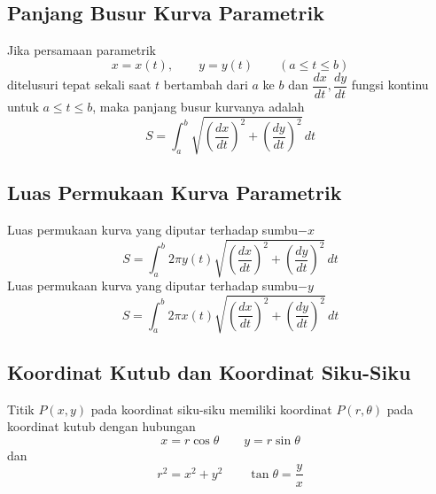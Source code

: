 \documentclass{article}
\begin{document}
\subsection{Panjang Busur Kurva Parametrik}
Jika persamaan parametrik 
$$ x=x(t),\qquad y=y(t)\qquad (a\leq t\leq b) $$
ditelusuri tepat sekali saat $t$ bertambah dari $a$ ke $b$ dan $\dfrac{dx}{dt},\dfrac{dy}{dt}$ fungsi kontinu untuk $a\leq t\leq b$, maka panjang busur kurvanya adalah 
$$ S=\int_a^b \sqrt{\left(\dfrac{dx}{dt}\right)^2+\left(\dfrac{dy}{dt}\right)^2} \, dt $$
\subsection{Luas Permukaan Kurva Parametrik}
Luas permukaan kurva yang diputar terhadap sumbu$-x$
$$ S=\int_a^b 2\pi y(t)\sqrt{\left(\dfrac{dx}{dt}\right)^2+\left(\dfrac{dy}{dt}\right)^2} \, dt $$
Luas permukaan kurva yang diputar terhadap sumbu$-y$
$$ S=\int_a^b 2\pi x(t)\sqrt{\left(\dfrac{dx}{dt}\right)^2+\left(\dfrac{dy}{dt}\right)^2} \, dt $$
\subsection{Koordinat Kutub dan Koordinat Siku-Siku}
Titik $P(x,y)$ pada koordinat siku-siku memiliki koordinat $P(r,\theta)$ pada koordinat kutub dengan hubungan
$$ x=r\cos \theta \qquad y=r\sin\theta $$
dan 
$$ r^2=x^2+y^2\qquad \tan \theta =\dfrac{y}{x} $$
\end{document}
